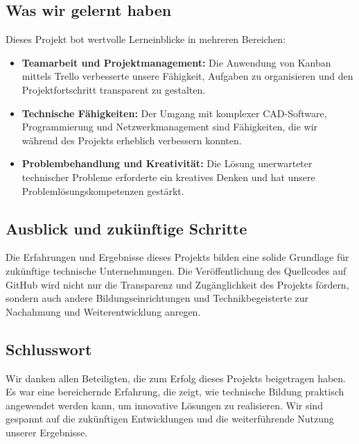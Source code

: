 \subsection{Was wir gelernt haben}
Dieses Projekt bot wertvolle Lerneinblicke in mehreren Bereichen:
\begin{itemize}
    \item \textbf{Teamarbeit und Projektmanagement:} Die Anwendung von Kanban mittels Trello verbesserte unsere Fähigkeit, Aufgaben zu organisieren und den Projektfortschritt transparent zu gestalten.
    \item \textbf{Technische Fähigkeiten:} Der Umgang mit komplexer CAD-Software, Programmierung und Netzwerkmanagement sind Fähigkeiten, die wir während des Projekts erheblich verbessern konnten.
    \item \textbf{Problembehandlung und Kreativität:} Die Lösung unerwarteter technischer Probleme erforderte ein kreatives Denken und hat unsere Problemlösungskompetenzen gestärkt.
\end{itemize}

\subsection{Ausblick und zukünftige Schritte}
Die Erfahrungen und Ergebnisse dieses Projekts bilden eine solide Grundlage für zukünftige technische Unternehmungen. Die Veröffentlichung des Quellcodes auf GitHub wird nicht nur die Transparenz und Zugänglichkeit des Projekts fördern, sondern auch andere Bildungseinrichtungen und Technikbegeisterte zur Nachahmung und Weiterentwicklung anregen.

\subsection{Schlusswort}
Wir danken allen Beteiligten, die zum Erfolg dieses Projekts beigetragen haben. Es war eine bereichernde Erfahrung, die zeigt, wie technische Bildung praktisch angewendet werden kann, um innovative Lösungen zu realisieren. Wir sind gespannt auf die zukünftigen Entwicklungen und die weiterführende Nutzung unserer Ergebnisse.

